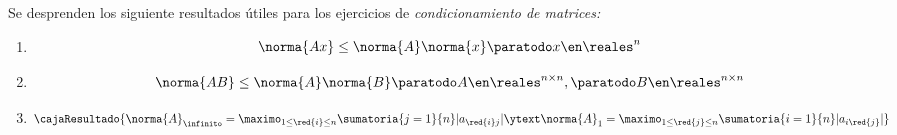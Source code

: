 \begin{enumerate}[label=\tiny\purple{\faIcon{snowman}}]
        Se desprenden los siguiente resultados útiles para los ejercicios de \textit{condicionamiento de matrices:}
        \begin{enumerate}[label=\purple{\faIcon{gamepad}$_{\arabic*)}$}]
          \item
                $$
                  \norma{Ax} \leq \norma{A} \norma{x} \paratodo x\en \reales^n
                $$
          \item
                $$
                  \norma{AB} \leq \norma{A} \norma{B} \paratodo A \en \reales^{n \times n}, \paratodo B \en \reales^{n \times n}
                $$
          \item
                $$
                  \cajaResultado{
                  \norma{A}_\infinito = \maximo_{1\leq \red{i} \leq n} \sumatoria{j=1}{n}|a_{\red{i}j}|
                  \ytext
                  \norma{A}_1 = \maximo_{1\leq \red{j} \leq n} \sumatoria{i=1}{n}|a_{i\red{j}}|
                  }
                $$
        \end{enumerate}
\end{enumerate}

